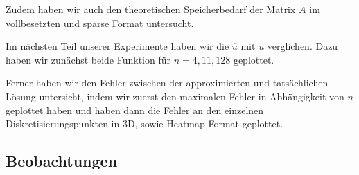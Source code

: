 \documentclass{scrartcl}
\theoremstyle{remark}
\begin{document}

Zudem haben wir auch den theoretischen Speicherbedarf der Matrix \(A\) im vollbesetzten und sparse Format untersucht.


Im nächsten Teil unserer Experimente haben wir die \(\hat{u}\) mit \(u\) verglichen.
Dazu haben wir zunächst beide Funktion für \(n = 4, 11, 128\) geplottet.


Ferner haben wir den Fehler zwischen der approximierten und tatsächlichen Lösung untersicht, indem wir zuerst den maximalen Fehler
in Abhängigkeit von \(n\) geplottet haben und haben dann die Fehler an den einzelnen Diskretisierungspunkten in 3D, sowie Heatmap-Format
geplottet.



\subsection{Beobachtungen}

\end{document}
